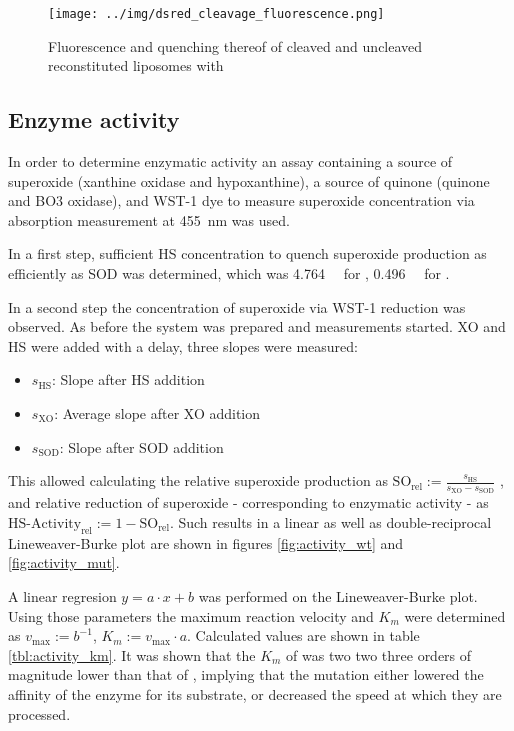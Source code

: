 \begin{figure}[h!]
	\centering
	\texttt{[image: ../img/dsred\_cleavage\_fluorescence.png]}
	\caption{Fluorescence and quenching thereof of cleaved and uncleaved reconstituted liposomes with \hsdsred{}}
	\label{fig:dsred_cleavage_fluorescence}
\end{figure}

\subsection{Enzyme activity}

In order to determine enzymatic activity an assay containing a source of
superoxide (xanthine oxidase and hypoxanthine), a source of quinone (quinone
and BO3 oxidase), and WST-1 dye to measure superoxide concentration via
absorption measurement at \SI{455}{\nm} was used.

In a first step, sufficient HS concentration to quench superoxide production as
efficiently as SOD was determined, which was \SI{4.764}{\micro\Molar} for 
\hsmut{}, \SI{0.496}{\micro\Molar} for \hs{}.

In a second step the concentration of superoxide via WST-1 reduction was
observed. As before the system was prepared and measurements started. XO and HS
were added with a delay, three slopes were measured:

\begin{itemize}
	\item $s_{\text{HS}}$: Slope after HS addition
	\item $s_{\text{XO}}$: Average slope after XO addition
	\item $s_{\text{SOD}}$: Slope after SOD addition
\end{itemize}

This allowed calculating the relative superoxide production as
$\text{SO}_{\text{rel}} := \frac{s_{\text{HS}}}{s_{\text{XO}} -
s_{\text{SOD}}}$ , and relative reduction of superoxide - corresponding to
enzymatic activity - as  $\text{HS-Activity}_{\text{rel}} := 1 -
\text{SO}_{\text{rel}}$. Such results in a linear as well as double-reciprocal
Lineweaver-Burke plot are shown in figures \ref{fig:activity_wt} and
\ref{fig:activity_mut}.

A linear regresion $y = a \cdot x + b$ was performed on the Lineweaver-Burke
plot. Using those parameters the maximum reaction velocity and $K_m$ were
determined as $v_\text{max} := b^{-1}$, $K_m := v_\text{max} \cdot a$.
Calculated values are shown in table \ref{tbl:activity_km}. It was shown that
the $K_m$ of \hsmut{} was two two three orders of magnitude lower than that
of \hs{}, implying that the mutation either lowered the affinity of the
enzyme for its substrate, or decreased the speed at which they are processed.

